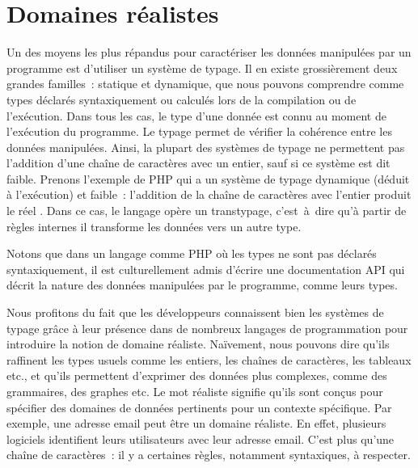 \section{Domaines réalistes}
\label{section:language:realdoms}

Un des moyens les plus répandus pour caractériser les données manipulées par un
programme est d'utiliser un système de {\strong typage}. Il en existe
grossièrement deux grandes familles~: {\strong statique} et {\strong dynamique},
que nous pouvons comprendre comme types déclarés syntaxiquement ou calculés lors
de la compilation ou de l'exécution. Dans tous les cas, le type d'une donnée est
connu au moment de l'exécution du programme. Le typage permet de {\strong
vérifier} la cohérence entre les données manipulées. Ainsi, la plupart des
systèmes de typage ne permettent pas l'addition d'une chaîne de caractères avec
un entier, sauf si ce système est dit faible. Prenons l'exemple de PHP qui a un
système de typage dynamique (déduit à l'exécution) et faible~: l'addition de la
chaîne de caractères  avec l'entier  produit le réel
. Dans ce cas, le langage opère un transtypage, c'est~à~dire qu'à
partir de règles internes il transforme les données vers un autre type.

Notons que dans un langage comme PHP où les types ne sont pas déclarés
syntaxiquement, il est culturellement admis d'écrire une documentation API qui
décrit la nature des données manipulées par le programme, comme leurs types.

Nous profitons du fait que les développeurs connaissent bien les systèmes de
typage grâce à leur présence dans de nombreux langages de programmation pour
introduire la notion de {\strong domaine réaliste}. Naïvement, nous pouvons dire
qu'ils raffinent les types usuels comme les entiers, les chaînes de caractères,
les tableaux etc., et qu'ils permettent d'exprimer des données plus complexes,
comme des grammaires, des graphes etc. Le mot {\strong réaliste} signifie qu'ils
sont conçus pour spécifier des domaines de données pertinents pour un contexte
spécifique. Par exemple, une adresse email peut être un domaine réaliste. En
effet, plusieurs logiciels identifient leurs utilisateurs avec leur adresse
email. C'est plus qu'une chaîne de caractères~: il y a certaines règles,
notamment syntaxiques, à respecter.


